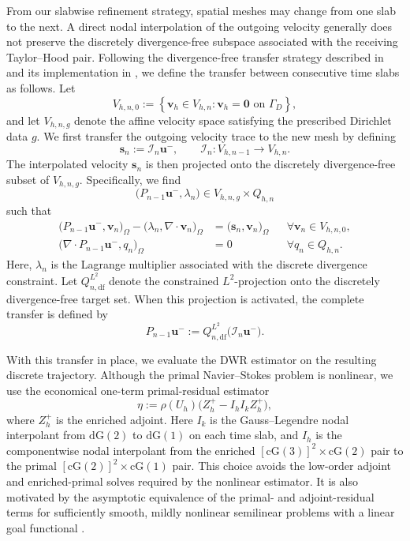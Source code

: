 From our slabwise refinement strategy, spatial meshes may change from one slab to the next. A direct nodal interpolation of the outgoing velocity generally does not preserve the discretely divergence-free subspace associated with the receiving Taylor--Hood pair. Following the divergence-free transfer strategy described in \cite{projection} and its implementation in \cite{non-flow}, we define the transfer between consecutive time slabs as follows. Let
\[
V_{h,n,0}
:=
\left\{
\boldsymbol v_h\in V_{h,n}:
\boldsymbol v_h=\boldsymbol 0
\text{ on }\Gamma_D
\right\},
\]
and let \(V_{h,n,g}\) denote the affine velocity space satisfying the prescribed Dirichlet data \(g\). We first transfer the outgoing velocity trace to the new mesh by defining
\[
\boldsymbol{s}_n:= \mathcal I_n\boldsymbol{u}^-,
\qquad
\mathcal I_n:V_{h,n-1}\to V_{h,n}.
\]
The interpolated velocity \(\boldsymbol{s}_n\) is then projected onto the discretely divergence-free subset of \(V_{h,n,g}\). Specifically, we find
\[
\bigl(P_{n-1}\boldsymbol{u}^-,\lambda_n\bigr)
\in V_{h,n,g}\times Q_{h,n}
\]
such that
\begin{subequations}
\begin{align}
\bigl(P_{n-1}\boldsymbol{u}^-,\boldsymbol v_n\bigr)_\Omega
-
\bigl(\lambda_n,\nabla\cdot\boldsymbol v_n\bigr)_\Omega
&=
\bigl(\boldsymbol{s}_n,\boldsymbol v_n\bigr)_\Omega
&&
\forall \boldsymbol v_n\in V_{h,n,0},\\
\bigl(\nabla\cdot P_{n-1}\boldsymbol{u}^-,q_n\bigr)_\Omega
&=0
&&
\forall q_n\in Q_{h,n}.
\end{align}
\end{subequations}
Here, \(\lambda_n\) is the Lagrange multiplier associated with the discrete divergence constraint. Let \(Q_{n,\mathrm{df}}^{L^2}\) denote the constrained \(L^2\)-projection onto the discretely divergence-free target set. When this projection is activated, the complete transfer is defined by
\begin{equation}
P_{n-1}\boldsymbol{u}^-
:=
Q_{n,\mathrm{df}}^{L^2}
\bigl(\mathcal I_n\boldsymbol{u}^-\bigr).
\end{equation}

With this transfer in place, we evaluate the DWR estimator on the resulting discrete trajectory. Although the primal Navier--Stokes problem is nonlinear, we use the economical one-term primal-residual estimator
\begin{equation}
  \eta := \rho(U_h)\bigl(Z_h^+-I_hI_kZ_h^+\bigr),
  \label{eq:cylinder-linear-estimator}
\end{equation}
where \(Z_h^+\) is the enriched adjoint. Here \(I_k\) is the Gauss--Legendre nodal interpolant from \(\mathrm{dG}(2)\) to \(\mathrm{dG}(1)\) on each time slab, and \(I_h\) is the componentwise nodal interpolant from the enriched \([\mathrm{cG}(3)]^2 \times \mathrm{cG}(2)\) pair to the primal \([\mathrm{cG}(2)]^2\times \mathrm{cG}(1)\) pair. This choice avoids the low-order adjoint and enriched-primal solves required by the nonlinear estimator. It is also motivated by the asymptotic equivalence of the primal- and adjoint-residual terms for sufficiently smooth, mildly nonlinear semilinear problems with a linear goal functional \cite{non-flow}. 


